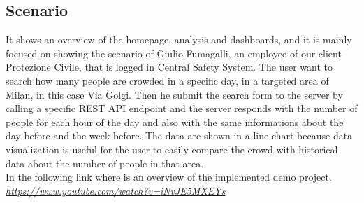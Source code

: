 \documentclass[../main.tex]{subfiles}
\begin{document}
\subsection{Scenario}
It shows an overview of the homepage, analysis and dashboards, and it is mainly focused on showing the scenario of Giulio Fumagalli, an employee of our client Protezione Civile, that is logged in Central Safety System.
The user want to search how many people are crowded in a specific day, in a targeted area of Milan, in this case Via Golgi.
Then he submit the search form to the server by calling a specific REST API endpoint and the server responds with the number of people for each hour of the day and also with the same informations about the day before and the week before.
The data are shown in a line chart because data visualization is useful for the user to easily compare the crowd with historical data about the number of people in that area.
\\
In the following link where is an overview of the implemented demo project.\\
\href{https://www.youtube.com/watch?v=iNvJE5MXEYs}{\textit{https://www.youtube.com/watch?v=iNvJE5MXEYs}}
\end{document}
